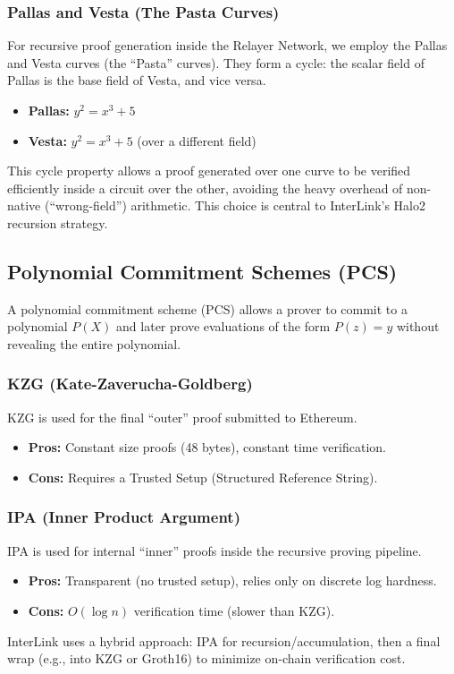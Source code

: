 \documentclass[11pt,a4paper]{article}
\begin{document}
\subsubsection{Pallas and Vesta (The Pasta Curves)}
For recursive proof generation inside the Relayer Network, we employ the Pallas and Vesta curves (the ``Pasta'' curves). They form a cycle: the scalar field of Pallas is the base field of Vesta, and vice versa.
\begin{itemize}
    \item \textbf{Pallas:} $y^2 = x^3 + 5$
    \item \textbf{Vesta:} $y^2 = x^3 + 5$ (over a different field)
\end{itemize}
This cycle property allows a proof generated over one curve to be verified efficiently inside a circuit over the other, avoiding the heavy overhead of non-native (``wrong-field'') arithmetic. This choice is central to InterLink's Halo2 recursion strategy.

\subsection{Polynomial Commitment Schemes (PCS)}
A polynomial commitment scheme (PCS) allows a prover to commit to a polynomial $P(X)$ and later prove evaluations of the form $P(z)=y$ without revealing the entire polynomial.

\subsubsection{KZG (Kate-Zaverucha-Goldberg)}
KZG is used for the final ``outer'' proof submitted to Ethereum.
\begin{itemize}
    \item \textbf{Pros:} Constant size proofs (48 bytes), constant time verification.
    \item \textbf{Cons:} Requires a Trusted Setup (Structured Reference String).
\end{itemize}

\subsubsection{IPA (Inner Product Argument)}
IPA is used for internal ``inner'' proofs inside the recursive proving pipeline.
\begin{itemize}
    \item \textbf{Pros:} Transparent (no trusted setup), relies only on discrete log hardness.
    \item \textbf{Cons:} $O(\log n)$ verification time (slower than KZG).
\end{itemize}
InterLink uses a hybrid approach: IPA for recursion/accumulation, then a final wrap (e.g., into KZG or Groth16) to minimize on-chain verification cost.
\end{document}
